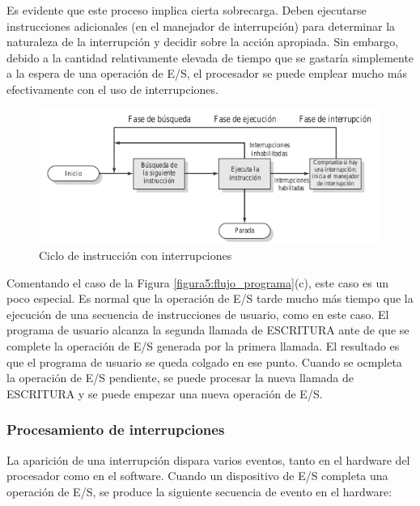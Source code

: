 \documentclass{article}
\begin{document}
					Es evidente que este proceso implica cierta sobrecarga. Deben ejecutarse instrucciones adicionales (en el manejador de interrupción) para determinar la naturaleza de la interrupción y decidir sobre la acción apropiada. Sin embargo, debido a la cantidad relativamente elevada de tiempo que se gastaría simplemente a la espera de una operación de E/S, el procesador se puede emplear mucho más efectivamente con el uso de interrupciones. \\
					
					\begin{figure}
					\caption{Ciclo de instrucción con interrupciones}
					\label{figura7:instruccionconinterrupcion}
					\centering
					\includegraphics[width=1\textwidth, scale=1]{figura7.png}
					\end{figure}
					
					Comentando el caso de la Figura \ref{figura5:flujo_programa}(c), este caso es un poco especial. Es normal que la operación de E/S tarde mucho más tiempo que la ejecución de una secuencia de instrucciones de usuario, como en este caso. El programa de usuario alcanza la segunda llamada de ESCRITURA ante de que se complete la operación de E/S generada por la primera llamada. El resultado es que el programa de usuario se queda colgado en ese punto. Cuando se ocmpleta la operación de E/S pendiente, se puede procesar la nueva llamada de ESCRITURA y se puede empezar una nueva operación de E/S.
					
					\subsubsection{Procesamiento de interrupciones}
						La aparición de una interrupción dispara varios eventos, tanto en el hardware del procesador como en el software. Cuando un dispositivo de E/S completa una operación de E/S, se produce la siguiente secuencia de evento en el hardware:
						
\end{document}
